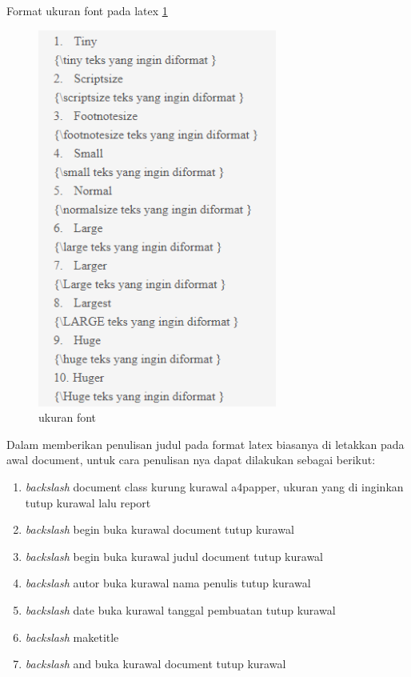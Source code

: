 Format ukuran font pada latex \ref{labelgambar1}

\begin{figure}[ht]
\centerline{\includegraphics[width=0.7\textwidth]{figures/1class.PNG}}
\caption{ukuran font}
\label{labelgambar1}
\end{figure}

Dalam memberikan penulisan judul pada format latex biasanya di letakkan pada awal document, untuk cara penulisan nya dapat dilakukan sebagai berikut:
\begin{enumerate}
  \item \textit{backslash} document class kurung kurawal a4papper, ukuran yang di inginkan tutup kurawal lalu report
  \item \textit{backslash} begin buka kurawal document tutup kurawal
  \item \textit{backslash} begin buka kurawal judul document tutup kurawal
  \item \textit{backslash} autor buka kurawal nama penulis tutup kurawal
  \item \textit{backslash} date buka kurawal tanggal pembuatan tutup kurawal
  \item \textit{backslash} maketitle
  \item \textit{backslash} and buka kurawal document tutup kurawal
\end{enumerate}

